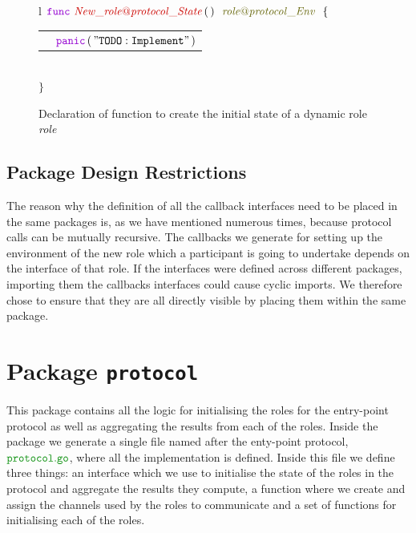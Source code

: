\documentclass[12pt,twoside]{report}
\begin{document}
\begin{figure}[!h]
    \begin{center}
        \begin{tabular}{l}
            $\gofunc\ \functionname{New\_role@protocol\_State} \, (\,)\ \ \interfacename{\localprotocol{role}{protocol}\_Env}\ \ \{$\\[3pt]

            \begin{tabular}{ll}
                \indent & $\gopanic\,(\,\mathtt{"TODO: Implement"}\,)$\\[3.5pt]
            \end{tabular}\\[3pt]
            $\}$
        \end{tabular}
    \end{center}
    \caption{Declaration of function to create the initial state of a dynamic role \textit{role} }
    \label{protocol-setup-func-gen}
\end{figure}

\subsection{Package Design Restrictions}

The reason why the definition of all the callback interfaces need to be placed in the same packages is, as we have mentioned numerous times, because protocol calls can be mutually recursive. The callbacks we generate for setting up the environment of the new role which a participant is going to undertake depends on the interface of that role. If the interfaces were defined across different packages, importing them the callbacks interfaces could cause cyclic imports. We therefore chose to ensure that they are all directly visible by placing them within the same package.

\section{Package \texttt{protocol}}\label{entry-point}
This package contains all the logic for initialising the roles for the entry-point protocol as well as aggregating the results from each of the roles. Inside the package we generate a single file named after the enty-point protocol, $\filename{protocol}$, where all the implementation is defined. Inside this file we define three things: an interface which we use to initialise the state of the roles in the protocol and aggregate the results they compute, a function where we create and assign the channels used by the roles to communicate and a set of functions for initialising each of the roles.\\
\end{document}
